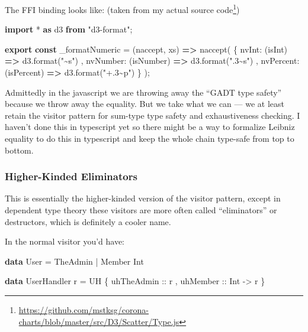 \documentclass[]{article}
\newenvironment{Shaded}{}{}
\newcommand{\DataTypeTok}[1]{\textcolor[rgb]{0.56,0.13,0.00}{#1}}
\newcommand{\FunctionTok}[1]{\textcolor[rgb]{0.02,0.16,0.49}{#1}}
\newcommand{\ImportTok}[1]{\textcolor[rgb]{0.00,0.50,0.00}{\textbf{#1}}}
\newcommand{\KeywordTok}[1]{\textcolor[rgb]{0.00,0.44,0.13}{\textbf{#1}}}
\newcommand{\NormalTok}[1]{#1}
\newcommand{\OperatorTok}[1]{\textcolor[rgb]{0.40,0.40,0.40}{#1}}
\newcommand{\OtherTok}[1]{\textcolor[rgb]{0.00,0.44,0.13}{#1}}
\newcommand{\StringTok}[1]{\textcolor[rgb]{0.25,0.44,0.63}{#1}}
\renewcommand{\href}[2]{#2\footnote{\url{#1}}}
\begin{document}
The FFI binding looks like: (taken from
\href{https://github.com/mstksg/corona-charts/blob/master/src/D3/Scatter/Type.js}{my
actual source code})

\begin{Shaded}
\begin{Highlighting}[]
\ImportTok{import} \OperatorTok{*} \ImportTok{as}\NormalTok{ d3 }\ImportTok{from} \StringTok{"d3{-}format"}\OperatorTok{;}

\ImportTok{export} \KeywordTok{const}\NormalTok{ \_formatNumeric }\OperatorTok{=}\NormalTok{ (naccept}\OperatorTok{,}\NormalTok{ xs) }\KeywordTok{=\textgreater{}}
  \FunctionTok{naccept}\NormalTok{(}
\NormalTok{    \{ }\DataTypeTok{nvInt}\OperatorTok{:}\NormalTok{ (isInt) }\KeywordTok{=\textgreater{}}\NormalTok{ d3}\OperatorTok{.}\FunctionTok{format}\NormalTok{(}\StringTok{"\textasciitilde{}s"}\NormalTok{)}
    \OperatorTok{,} \DataTypeTok{nvNumber}\OperatorTok{:}\NormalTok{ (isNumber) }\KeywordTok{=\textgreater{}}\NormalTok{ d3}\OperatorTok{.}\FunctionTok{format}\NormalTok{(}\StringTok{".3\textasciitilde{}s"}\NormalTok{)}
    \OperatorTok{,} \DataTypeTok{nvPercent}\OperatorTok{:}\NormalTok{ (isPercent) }\KeywordTok{=\textgreater{}}\NormalTok{ d3}\OperatorTok{.}\FunctionTok{format}\NormalTok{(}\StringTok{"+.3\textasciitilde{}p"}\NormalTok{)}
\NormalTok{    \}}
\NormalTok{  )}\OperatorTok{;}
\end{Highlighting}
\end{Shaded}

Admittedly in the javascript we are throwing away the ``GADT type safety''
because we throw away the equality. But we take what we can --- we at least
retain the visitor pattern for sum-type type safety and exhaustiveness checking.
I haven't done this in typescript yet so there might be a way to formalize
Leibniz equality to do this in typescript and keep the whole chain type-safe
from top to bottom.

\subsubsection{Higher-Kinded Eliminators}\label{higher-kinded-eliminators}

This is essentially the higher-kinded version of the visitor pattern, except in
dependent type theory these visitors are more often called ``eliminators'' or
destructors, which is definitely a cooler name.

In the normal visitor you'd have:

\begin{Shaded}
\begin{Highlighting}[]
\KeywordTok{data} \DataTypeTok{User} \OtherTok{=} \DataTypeTok{TheAdmin} \OperatorTok{|} \DataTypeTok{Member} \DataTypeTok{Int}

\KeywordTok{data} \DataTypeTok{UserHandler}\NormalTok{ r }\OtherTok{=} \DataTypeTok{UH}
\NormalTok{    \{}\OtherTok{ uhTheAdmin ::}\NormalTok{ r}
\NormalTok{    ,}\OtherTok{ uhMember ::} \DataTypeTok{Int} \OtherTok{{-}\textgreater{}}\NormalTok{ r}
\NormalTok{    \}}
\end{Highlighting}
\end{Shaded}
\end{document}
